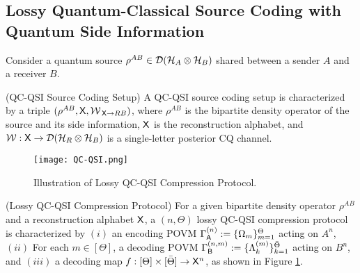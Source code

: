 \subsection{Lossy Quantum-Classical Source Coding with Quantum Side Information}
Consider a quantum source $\rho^{AB}\in \mathcal{D}(\mathcal{H}_{A}\otimes \mathcal{H}_{B})$ shared between a sender $A$ and a receiver $B$.
\begin{definition}(QC-QSI Source Coding Setup) A QC-QSI source coding setup is characterized by a triple $(\rho^{AB},\mathsf{X},\mathcal{W}_{\!\ \mathsf{X}\rightarrow R B})$, where $\rho^{AB}$ is the bipartite density operator of the source and its side information, $\mathsf{X}$ is the reconstruction alphabet, and $\mathcal{W}:\mathsf{X}\rightarrow\mathcal{D}(\mathcal{H}_{R } \otimes \mathcal{H}_B)$ is a single-letter posterior CQ channel.
\end{definition}
\begin{figure}[!htb]
    \centering
    \texttt{[image: QC-QSI.png]}
    \vspace{-5pt}
    \caption{Illustration of Lossy QC-QSI Compression Protocol.}
    \label{fig:QC-QSI}
    \vspace{-5pt}
\end{figure}
\begin{definition}
    (Lossy QC-QSI Compression Protocol) For a given bipartite density operator $\rho^{AB}$ and a reconstruction alphabet $\mathsf{X}$, a $(n,\Theta)$ lossy QC-QSI compression protocol is characterized by $(i)$ an encoding POVM $\Gamma^{(n)}_{\mathsf{A}} := \{\Omega_{m}\}_{m=1}^{\Theta}$ acting on $A^n$, $(ii)$ For each $m\in[\Theta]$, a decoding POVM $\Gamma^{(n,m)}_{\mathsf{B}} := \{\Lambda^{(m)}_{k}\}_{k=1}^{\bar{\Theta}}$ acting on $B^n$, and  $(iii)$ a decoding map $f:[\Theta] \times [\bar{\Theta}] \rightarrow \mathsf{X}^n$, as shown in Figure \ref{fig:QC-QSI}. 
\end{definition}
